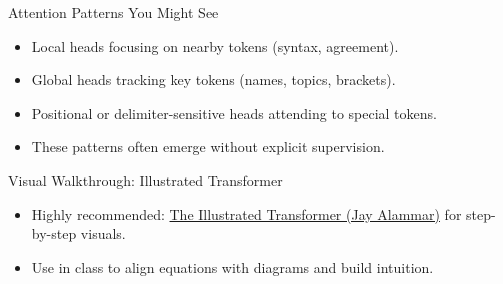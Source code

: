 \documentclass[aspectratio=169]{beamer}
\begin{document}
\begin{frame}{Attention Patterns You Might See}
  \begin{itemize}
    \item Local heads focusing on nearby tokens (syntax, agreement).
    \item Global heads tracking key tokens (names, topics, brackets).
    \item Positional or delimiter-sensitive heads attending to special tokens.
    \item These patterns often emerge without explicit supervision.
  \end{itemize}
\end{frame}

\begin{frame}{Visual Walkthrough: Illustrated Transformer}
  \begin{itemize}
    \item Highly recommended: \href{https://jalammar.github.io/illustrated-transformer/}{The Illustrated Transformer (Jay Alammar)} for step-by-step visuals.
    \item Use in class to align equations with diagrams and build intuition.
  \end{itemize}
\end{frame}
\end{document}
